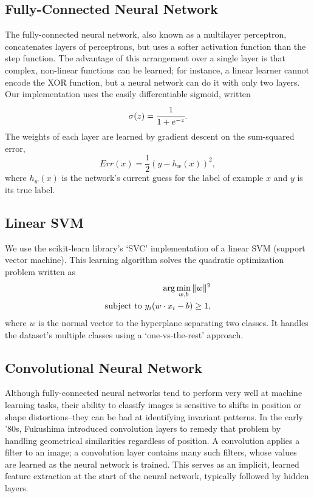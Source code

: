 \documentclass{acm_proc_article-sp}
\begin{document}
\subsection{Fully-Connected Neural Network}
The fully-connected neural network, also known as a multilayer perceptron, concatenates layers of perceptrons, but uses a softer activation function than the step function. The advantage of this arrangement over a single layer is that complex, non-linear functions can be learned; for instance, a linear learner cannot encode the XOR function, but a neural network can do it with only two layers. Our implementation uses the easily differentiable sigmoid, written $$\sigma(z) = \cfrac{1}{1 + e^{-z}}.$$ The weights of each layer are learned by gradient descent on the sum-squared error, $$Err(x) = \frac{1}{2}(y - h_w(x))^2,$$ where $h_w(x)$ is the network's current guess for the label of example $x$ and $y$ is its true label.

\subsection{Linear SVM}
We use the scikit-learn \cite{scikit-learn} library's `SVC' implementation of a linear SVM (support vector machine). This learning algorithm solves the quadratic optimization problem written as
\begin{align*} 
\hbox{arg} \min_{w,b} \|w\|^2 \\
\hbox{subject to } y_i(w \cdot x_i - b) \geq 1,
\end{align*}
where $w$ is the normal vector to the hyperplane separating two classes. It handles the dataset's multiple classes using a `one-vs-the-rest' approach.

\subsection{Convolutional Neural Network}
Although fully-connected neural networks tend to perform very well at machine learning tasks, their ability to classify images is sensitive to shifts in position or shape distortions--they can be bad at identifying invariant patterns. In the early '80s, Fukushima introduced convolution layers to remedy that problem by handling geometrical similarities regardless of position.\cite{Fukushima} A convolution applies a filter to an image; a convolution layer contains many such filters, whose values are learned as the neural network is trained. This serves as an implicit, learned feature extraction at the start of the neural network, typically followed by hidden layers.
\end{document}
